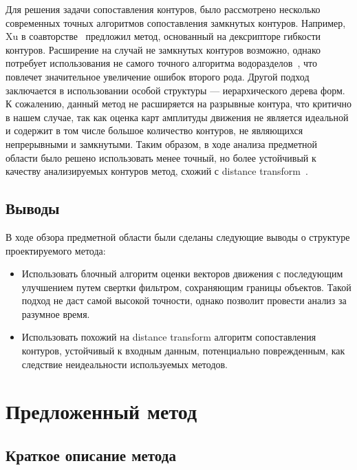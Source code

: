 \documentclass[14pt, a4paper]{extarticle}
\begin{document}
Для решения задачи сопоставления контуров, было рассмотрено несколько современных точных алгоритмов
сопоставления замкнутых контуров. Например, Xu в соавторстве~\cite{xu20092d} предложил метод,
основанный на дексрипторе гибкости контуров. Расширение на случай не замкнутых контуров возможно, 
однако потребует использования не самого точного алгоритма водоразделов~\cite{roerdink2000watershed}, 
что повлечет значительное увеличение ошибок второго рода. Другой 
подход~\cite{felzenszwalb2007hierarchical} заключается в использовании особой структуры ---
иерархического дерева форм. К сожалению, данный метод не расширяется на разрывные контура, 
что критично в нашем случае, так как оценка карт амплитуды движения не является идеальной и содержит
в том числе большое количество контуров, не являющихся непрерывными и замкнутыми. Таким образом, 
в ходе анализа предметной области было решено использовать менее точный, но более устойчивый
к качеству анализируемых контуров метод, схожий с distance transform~\cite{borgefors1986distance}.

\subsection{Выводы}

В ходе обзора предметной области были сделаны следующие выводы о структуре проектируемого метода:

\begin{itemize}
	\item Использовать блочный алгоритм оценки векторов движения с последующим улучшением
	путем свертки фильтром, сохраняющим границы объектов. Такой подход не даст самой высокой 
	точности, однако позволит провести анализ за разумное время.
	\item Использовать похожий на distance transform алгоритм сопоставления контуров, устойчивый
	к входным данным, потенциально поврежденным, как следствие неидеальности используемых методов.
\end{itemize}

\newpage
\section{Предложенный метод}

\subsection{Краткое описание метода}


\end{document}
